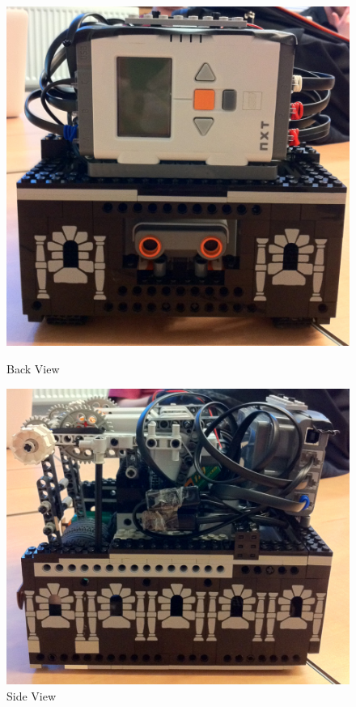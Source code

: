 \documentclass[12pt, a4paper, titlepage]{article}
\begin{document}
\begin{figure}[ht]
\begin{minipage}[b]{0.5\linewidth}
\centering
\includegraphics[scale=0.8]{images/robot/backview.jpg}
\caption{Back View}
\label{fig:backview}
\end{minipage}
\hspace{0.5cm}
\begin{minipage}[b]{0.5\linewidth}
\centering
\includegraphics[scale=0.8]{images/robot/sideview.jpg}
\caption{Side View}
\label{fig:sideview}
\end{minipage}
\end{figure}
\end{document}

